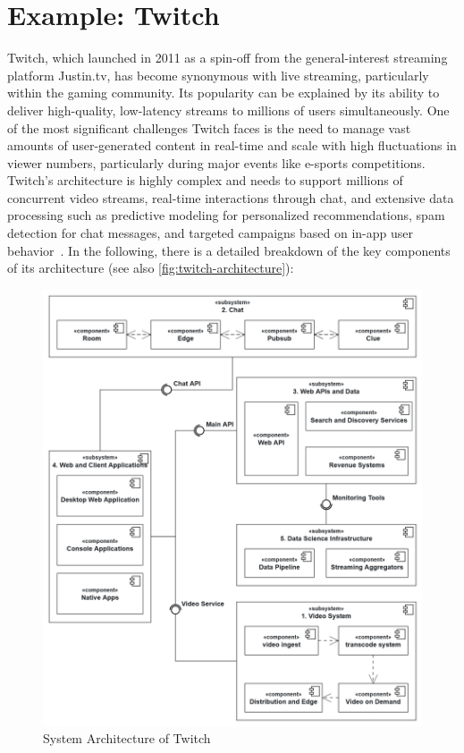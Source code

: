 \section{Example: Twitch}
Twitch, which launched in 2011 as a spin-off from the general-interest streaming platform Justin.tv, has become synonymous with live streaming, particularly within the gaming community. Its popularity can be explained by its ability to deliver high-quality, low-latency streams to millions of users simultaneously. 
One of the most significant challenges Twitch faces is the need to manage vast amounts of user-generated content in real-time and scale with high fluctuations in viewer numbers, particularly during major events like e-sports competitions.
Twitch's architecture is highly complex and needs to support millions of concurrent video streams, real-time interactions through chat, and extensive data processing such as predictive modeling for personalized recommendations, spam detection for chat messages, and targeted campaigns based on in-app user behavior~\parencite{twitch_analytics}. In the following, there is a detailed breakdown of the key components of its architecture (see also \autoref{fig:twitch-architecture}):

\begin{figure}[htpb]
    \centering
    \includegraphics[width=\linewidth]{images/TwitchArchitectureNew.png}
    \caption[System Architecture of Twitch]{System Architecture of Twitch}\label{fig:twitch-architecture}
\end{figure}

